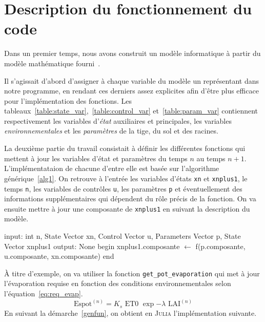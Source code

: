\section{Description du fonctionnement du code}
Dans un premier temps, nous avons construit un modèle informatique à partir
du modèle mathématique fourni~\cite{lnas_model_wheat}.

Il s'agissait d'abord d'assigner à chaque variable du modèle un représentant
dans notre programme, en rendant ces derniers assez explicites
afin d'être plus efficace pour l'implémentation des fonctions.
Les tableaux~\ref{table:state_var},~\ref{table:control_var} et~\ref{table:param_var}
contiennent respectivement les variables d'\emph{état} auxiliaires et principales, 
les variables \emph{environnementales} et les \emph{paramètres} de la tige, du sol et des racines.



La deuxième partie du travail consistait à définir les différentes fonctions
qui mettent à jour les variables d'état et paramètres du 
temps $n$ au temps $n+1$.
L'implémentataion de chacune d'entre elle est basée sur l'algorithme générique~\ref{alg1}.
On retrouve à l'entrée les variables d'états \texttt{xn} et \texttt{xnplus1},
le temps \texttt{n}, les variables de contrôles \texttt{u}, les paramètres \texttt{p}
et éventuellement des informations supplémentaires qui dépendent
du rôle précis de la fonction.
On va ensuite mettre à jour une composante de \lstinline{xnplus1}
en suivant la description du modèle.

\begin{algorithm}[caption={Algorithme générique qui sert de base pour l'implémentation
  des fonctions. La fonction $f$ n'est pas définie mais sert de placeholder
  pour représenter les opérations nécessaires à la mise à jour de xnplus1.}, label={genfun}]
 input: int n, State Vector xn, Control Vector u, Parameters Vector p, State Vector xnplus1
 output: None
 begin
   xnplus1.composante $\gets$ f(p.composante, u.composante, xn.composante)
 end       
\end{algorithm}

À titre d'exemple, on va utiliser la fonction \texttt{get\_pot\_evaporation} qui met
à jour l'évaporation requise en fonction des conditions environnementales
selon l'équation~\ref{eq:req_evap}.
\begin{equation}
  \text{Espot}^{(n)} = K_s \text{ ET0 } \exp{-\lambda \text{ LAI}^{(n)}}
  \label{eq:req_evap}
\end{equation}
En suivant la démarche~\ref{genfun}, on obtient en \textsc{Julia}
l'implémentation suivante.



